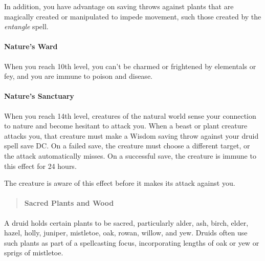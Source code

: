 \documentclass[
]{article}
\begin{document}
In addition, you have advantage on saving throws against plants that are
magically created or manipulated to impede movement, such those created
by the \emph{entangle} spell.

\hypertarget{natures-ward}{%
\paragraph{Nature's Ward}\label{natures-ward}}

When you reach 10th level, you can't be charmed or frightened by
elementals or fey, and you are immune to poison and disease.

\hypertarget{natures-sanctuary}{%
\paragraph{Nature's Sanctuary}\label{natures-sanctuary}}

When you reach 14th level, creatures of the natural world sense your
connection to nature and become hesitant to attack you. When a beast or
plant creature attacks you, that creature must make a Wisdom saving
throw against your druid spell save DC. On a failed save, the creature
must choose a different target, or the attack automatically misses. On a
successful save, the creature is immune to this effect for 24 hours.

The creature is aware of this effect before it makes its attack against
you.

\begin{quote}
\mbox{}%
\hypertarget{sacred-plants-and-wood}{%
\paragraph{Sacred Plants and Wood}\label{sacred-plants-and-wood}}
\end{quote}

A druid holds certain plants to be sacred, particularly alder, ash,
birch, elder, hazel, holly, juniper, mistletoe, oak, rowan, willow, and
yew. Druids often use such plants as part of a spellcasting focus,
incorporating lengths of oak or yew or sprigs of mistletoe.
\end{document}

